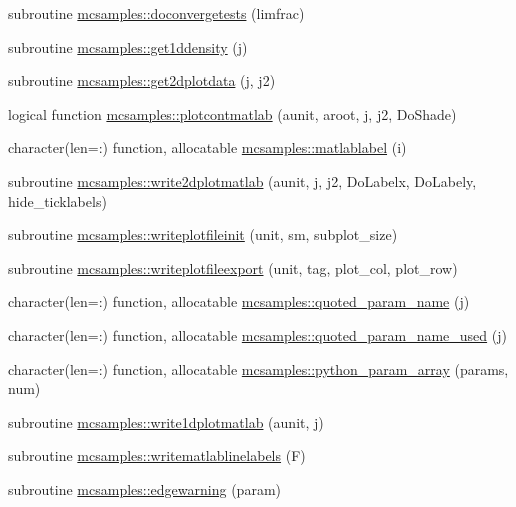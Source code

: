 \begin{DoxyCompactItemize}
\item 
subroutine \mbox{\hyperlink{namespacemcsamples_a4a0eac91a04d742f776ae4f8f15d919c}{mcsamples\+::doconvergetests}} (limfrac)
\item 
subroutine \mbox{\hyperlink{namespacemcsamples_a9bbfd241a96107124f0af5ef8d0fbe61}{mcsamples\+::get1ddensity}} (j)
\item 
subroutine \mbox{\hyperlink{namespacemcsamples_a67c86279d2ba781324578c13807fa812}{mcsamples\+::get2dplotdata}} (j, j2)
\item 
logical function \mbox{\hyperlink{namespacemcsamples_a12e5ebfb72dd60020dd1aef9afa7ad2e}{mcsamples\+::plotcontmatlab}} (aunit, aroot, j, j2, Do\+Shade)
\item 
character(len=\+:) function, allocatable \mbox{\hyperlink{namespacemcsamples_ab0762a08afdb1f7f972b966091ef0918}{mcsamples\+::matlablabel}} (i)
\item 
subroutine \mbox{\hyperlink{namespacemcsamples_a6ac9a19d5b3622b2a2dea19257a37c36}{mcsamples\+::write2dplotmatlab}} (aunit, j, j2, Do\+Labelx, Do\+Labely, hide\+\_\+ticklabels)
\item 
subroutine \mbox{\hyperlink{namespacemcsamples_a22e27e5c21abdb2a3d8cf2816d2f8acb}{mcsamples\+::writeplotfileinit}} (unit, sm, subplot\+\_\+size)
\item 
subroutine \mbox{\hyperlink{namespacemcsamples_aeb1af08402647e8ef9e1d8f97e774e3a}{mcsamples\+::writeplotfileexport}} (unit, tag, plot\+\_\+col, plot\+\_\+row)
\item 
character(len=\+:) function, allocatable \mbox{\hyperlink{namespacemcsamples_a1084f1fea1eddc1385237c666e34115b}{mcsamples\+::quoted\+\_\+param\+\_\+name}} (j)
\item 
character(len=\+:) function, allocatable \mbox{\hyperlink{namespacemcsamples_aaed4d229224d51b97154b233f072fae9}{mcsamples\+::quoted\+\_\+param\+\_\+name\+\_\+used}} (j)
\item 
character(len=\+:) function, allocatable \mbox{\hyperlink{namespacemcsamples_a61ce07e713757fee14a963684c25fe12}{mcsamples\+::python\+\_\+param\+\_\+array}} (params, num)
\item 
subroutine \mbox{\hyperlink{namespacemcsamples_a0a903a19ac6139be1cc98a32218ec801}{mcsamples\+::write1dplotmatlab}} (aunit, j)
\item 
subroutine \mbox{\hyperlink{namespacemcsamples_a7fb178ee92298048973cca975336489e}{mcsamples\+::writematlablinelabels}} (F)
\item 
subroutine \mbox{\hyperlink{namespacemcsamples_a083f4a491dcb1c55ed0f61c0e4f435b1}{mcsamples\+::edgewarning}} (param)

\end{DoxyCompactItemize}
